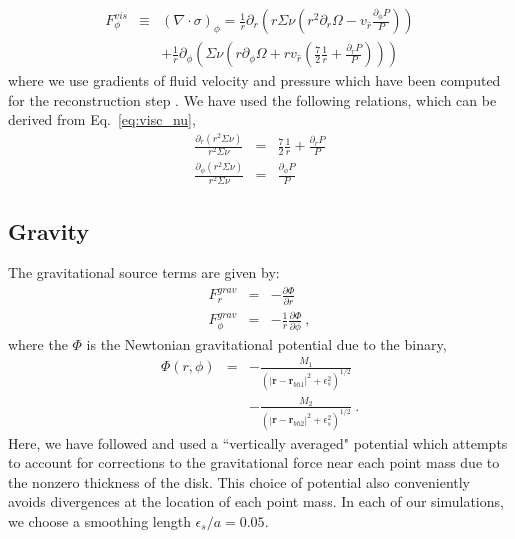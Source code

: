 \documentclass[apj]{emulateapj}
\begin{document}
               \begin{eqnarray}
                 F^{vis}_{\phi} &\equiv& (\nabla \cdot \sigma)_{\phi} = \frac{1}{r} \partial_r \left(r \Sigma \nu 
               \left(r^2 \partial_r \Omega - v_{\hat{r}} \frac{\partial_{\phi}P}{P} \right)\right)\nonumber\\
               &&+  \frac{1}{r}\partial_{\phi}\left(
               \Sigma \nu 
               \left(r \partial_{\phi} \Omega + r v_{\hat{r}}  \left(\frac{7}{2} \frac{1}{r} + \frac{\partial_{r}P}{P}\right) \right)
             \right)
           \end{eqnarray}
           where we use gradients of fluid velocity and pressure which have been computed for the reconstruction step \citep{duffell11}. We have used the following relations, which can be derived from Eq.~\ref{eq:visc_nu},
           \begin{eqnarray}
             \frac{\partial_{r}(r^2 \Sigma \nu)}{r^2 \Sigma \nu} &=& \frac{7}{2} \frac{1}{r} + \frac{\partial_{r}P}{P}\\
             \frac{\partial_{\phi}(r^2 \Sigma \nu)}{r^2 \Sigma \nu} &=& \frac{\partial_{\phi}P}{P}
           \end{eqnarray}


           \subsection{Gravity}
\label{sec:grav}
           
           The gravitational source terms are given by:
           \begin{eqnarray}
             F^{grav}_r &=& -\frac{\partial \Phi}{\partial r}\\
             F^{grav}_{\phi} &=&  -\frac{1}{r}\frac{\partial \Phi}{\partial \phi} \ ,
           \end{eqnarray}
           where the $\Phi$ is the Newtonian gravitational potential due to the binary,
           \begin{eqnarray}
             \Phi(r,\phi) &=& - \frac{M_1 }{\left(\left|\mathbf{r}-\mathbf{r}_{bh1}\right|^2 + \epsilon_s^2 \right)^{1/2}}\nonumber\\
                          &&- \frac{M_2 }{\left(\left|\mathbf{r}-\mathbf{r}_{bh2}\right|^2 + \epsilon_s^2 \right)^{1/2}} \ .
           \end{eqnarray}
           Here, we have followed \citet{duffell13,tanaka02,masset02,muller12} and used a ``vertically averaged" potential which attempts to account for corrections to the gravitational force near each point mass due to the nonzero thickness of the disk. This choice of potential also conveniently avoids divergences at the location of each point mass. In each of our simulations,  we choose a smoothing length $\epsilon_s / a = 0.05$.
\end{document}
